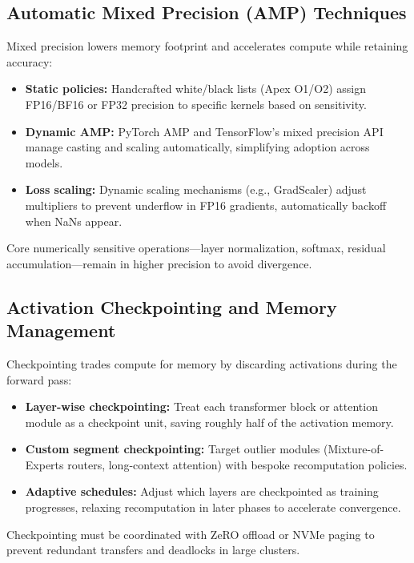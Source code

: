 \documentclass{article}
\begin{document}
\subsection{Automatic Mixed Precision (AMP) Techniques}
Mixed precision lowers memory footprint and accelerates compute while retaining accuracy:
\begin{itemize}
  \item \textbf{Static policies:} Handcrafted white/black lists (Apex O1/O2) assign FP16/BF16 or FP32 precision to specific kernels based on sensitivity.
  \item \textbf{Dynamic AMP:} PyTorch AMP and TensorFlow's mixed precision API manage casting and scaling automatically, simplifying adoption across models.
  \item \textbf{Loss scaling:} Dynamic scaling mechanisms (e.g., GradScaler) adjust multipliers to prevent underflow in FP16 gradients, automatically backoff when NaNs appear.
\end{itemize}
Core numerically sensitive operations—layer normalization, softmax, residual accumulation—remain in higher precision to avoid divergence.

\subsection{Activation Checkpointing and Memory Management}
Checkpointing trades compute for memory by discarding activations during the forward pass:
\begin{itemize}
  \item \textbf{Layer-wise checkpointing:} Treat each transformer block or attention module as a checkpoint unit, saving roughly half of the activation memory.
  \item \textbf{Custom segment checkpointing:} Target outlier modules (Mixture-of-Experts routers, long-context attention) with bespoke recomputation policies.
  \item \textbf{Adaptive schedules:} Adjust which layers are checkpointed as training progresses, relaxing recomputation in later phases to accelerate convergence.
\end{itemize}
Checkpointing must be coordinated with ZeRO offload or NVMe paging to prevent redundant transfers and deadlocks in large clusters.
\end{document}
